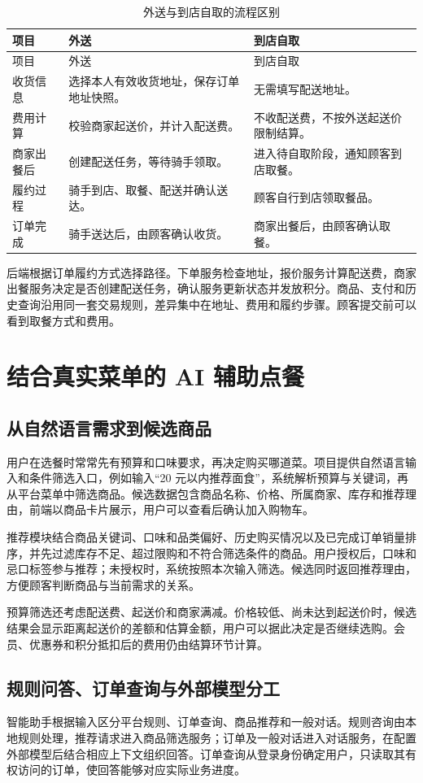 \begin{longtable}{L{.20\linewidth}L{.35\linewidth}L{.36\linewidth}}
\caption{外送与到店自取的流程区别}\label{tab:delivery-modes}\\\toprule 项目&外送&到店自取\\\midrule\endfirsthead\toprule 项目&外送&到店自取\\\midrule\endhead
收货信息&选择本人有效收货地址，保存订单地址快照。&无需填写配送地址。\\
费用计算&校验商家起送价，并计入配送费。&不收配送费，不按外送起送价限制结算。\\
商家出餐后&创建配送任务，等待骑手领取。&进入待自取阶段，通知顾客到店取餐。\\
履约过程&骑手到店、取餐、配送并确认送达。&顾客自行到店领取餐品。\\
订单完成&骑手送达后，由顾客确认收货。&商家出餐后，由顾客确认取餐。\\\bottomrule
\end{longtable}

后端根据订单履约方式选择路径。下单服务检查地址，报价服务计算配送费，商家出餐服务决定是否创建配送任务，确认服务更新状态并发放积分。商品、支付和历史查询沿用同一套交易规则，差异集中在地址、费用和履约步骤。顾客提交前可以看到取餐方式和费用。

\section{结合真实菜单的 AI 辅助点餐}
\subsection{从自然语言需求到候选商品}
用户在选餐时常常先有预算和口味要求，再决定购买哪道菜。项目提供自然语言输入和条件筛选入口，例如输入“20 元以内推荐面食”，系统解析预算与关键词，再从平台菜单中筛选商品。候选数据包含商品名称、价格、所属商家、库存和推荐理由，前端以商品卡片展示，用户可以查看后确认加入购物车。

推荐模块结合商品关键词、口味和品类偏好、历史购买情况以及已完成订单销量排序，并先过滤库存不足、超过限购和不符合筛选条件的商品。用户授权后，口味和忌口标签参与推荐；未授权时，系统按照本次输入筛选。候选同时返回推荐理由，方便顾客判断商品与当前需求的关系。

预算筛选还考虑配送费、起送价和商家满减。价格较低、尚未达到起送价时，候选结果会显示距离起送价的差额和估算金额，用户可以据此决定是否继续选购。会员、优惠券和积分抵扣后的费用仍由结算环节计算。

\subsection{规则问答、订单查询与外部模型分工}
智能助手根据输入区分平台规则、订单查询、商品推荐和一般对话。规则咨询由本地规则处理，推荐请求进入商品筛选服务；订单及一般对话进入对话服务，在配置外部模型后结合相应上下文组织回答。订单查询从登录身份确定用户，只读取其有权访问的订单，使回答能够对应实际业务进度。

